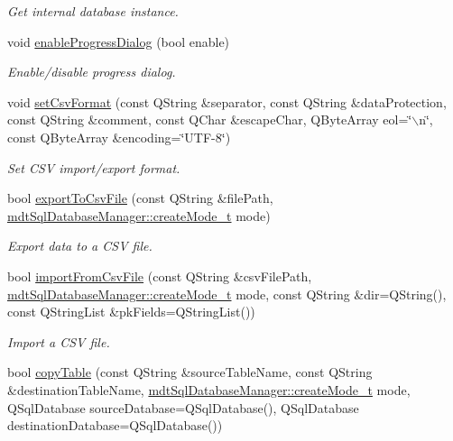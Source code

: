 \begin{DoxyCompactItemize}
\begin{DoxyCompactList}\small\item\em Get internal database instance. \end{DoxyCompactList}\item 
void \hyperlink{classmdt_data_table_manager_a139611cc21836438053226b1d7576201}{enableProgressDialog} (bool enable)
\begin{DoxyCompactList}\small\item\em Enable/disable progress dialog. \end{DoxyCompactList}\item 
void \hyperlink{classmdt_data_table_manager_a755ea0471525645157f4d4843b6a4e8a}{setCsvFormat} (const QString \&separator, const QString \&dataProtection, const QString \&comment, const QChar \&escapeChar, QByteArray eol=\char`\"{}$\backslash$n\char`\"{}, const QByteArray \&encoding=\char`\"{}UTF-\/8\char`\"{})
\begin{DoxyCompactList}\small\item\em Set CSV import/export format. \end{DoxyCompactList}\item 
bool \hyperlink{classmdt_data_table_manager_abe733f071ca77579522823598e79dd9a}{exportToCsvFile} (const QString \&filePath, \hyperlink{classmdt_sql_database_manager_a2f5b46d67a88095053a5edfc415c7418}{mdtSqlDatabaseManager::createMode\_\-t} mode)
\begin{DoxyCompactList}\small\item\em Export data to a CSV file. \end{DoxyCompactList}\item 
bool \hyperlink{classmdt_data_table_manager_a668cc3d94e6aa5dab406a0fd319351af}{importFromCsvFile} (const QString \&csvFilePath, \hyperlink{classmdt_sql_database_manager_a2f5b46d67a88095053a5edfc415c7418}{mdtSqlDatabaseManager::createMode\_\-t} mode, const QString \&dir=QString(), const QStringList \&pkFields=QStringList())
\begin{DoxyCompactList}\small\item\em Import a CSV file. \end{DoxyCompactList}\item 
bool \hyperlink{classmdt_data_table_manager_a5c8aaf4f42a50bd0c216ef29adc9d79f}{copyTable} (const QString \&sourceTableName, const QString \&destinationTableName, \hyperlink{classmdt_sql_database_manager_a2f5b46d67a88095053a5edfc415c7418}{mdtSqlDatabaseManager::createMode\_\-t} mode, QSqlDatabase sourceDatabase=QSqlDatabase(), QSqlDatabase destinationDatabase=QSqlDatabase())

\end{DoxyCompactItemize}
